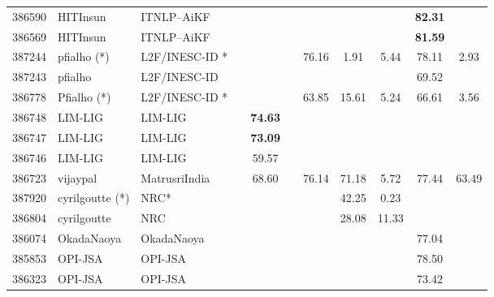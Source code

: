 \documentclass[11pt,a4paper]{article}
\begin{document}
\begin{table*}[htp!!]
\begin{center}
\begin{tabu}{|HHl| *{8}{S[table-format=2.2]|}}
386590 & HITInsun & ITNLP–AiKF \cite{liu-EtAl:2017:SemEval1} &  &  &  &  &  &  & {\bf 82.31}\hspace{0.55em} & \\ 

386569 & HITInsun & ITNLP–AiKF \cite{liu-EtAl:2017:SemEval1} &  &  &  &  &  &  & {\bf 81.59}\hspace{0.55em} & \\  

387244 & pfialho (*) & L2F/INESC-ID \cite{fialho-EtAl:2017:SemEval}* &  &  &  & 76.16 & 1.91 & 5.44 & 78.11 & 2.93\\ 

387243 & pfialho & L2F/INESC-ID \cite{fialho-EtAl:2017:SemEval} &  &  &  &  &  &  & 69.52 & \\ 

386778 & Pfialho (*) & L2F/INESC-ID \cite{fialho-EtAl:2017:SemEval}* &  &  &  & 63.85 & 15.61 & 5.24 & 66.61 & 3.56\\ 

386748 & LIM-LIG & LIM-LIG \cite{nagoudi-ferrero-schwab:2017:SemEval} &  & {\bf 74.63}\hspace{0.55em} &  &  &  &  &  & \\ 

386747 & LIM-LIG & LIM-LIG \cite{nagoudi-ferrero-schwab:2017:SemEval} &  & {\bf 73.09}\hspace{0.55em} &  &  &  &  &  & \\ 

386746 & LIM-LIG & LIM-LIG \cite{nagoudi-ferrero-schwab:2017:SemEval} &  & 59.57 &  &  &  &  &  & \\

386723 & vijaypal & MatrusriIndia &  & 68.60 &  & 76.14 & 71.18 & 5.72 & 77.44 & 63.49\\ 

387920 & cyrilgoutte (*) & NRC* &  &  &  &  & 42.25 & 0.23 &  & \\ 

386804 & cyrilgoutte & NRC &  &  &  &  & 28.08 & 11.33 &  & \\ 

386074 & OkadaNaoya & OkadaNaoya &  &  &  &  &  &  & 77.04 & \\ 

385853 & OPI-JSA & OPI-JSA \cite{spiewak-sobecki-karas:2017:SemEval} &  &  &  &  &  &  & 78.50 & \\ 

386323 & OPI-JSA & OPI-JSA \cite{spiewak-sobecki-karas:2017:SemEval} &  &  &  &  &  &  & 73.42 & \\ 


\end{tabu}
\end{center}
\end{table*}
\end{document}
